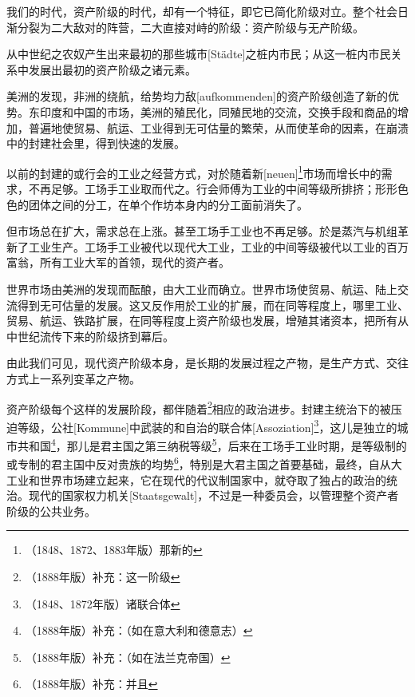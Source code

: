 \documentclass[a4paper,12pt]{ctexart}
\begin{document}
我们的时代，资产阶级的时代，却有一个特征，即它已简化阶级对立。整个社会日渐分裂为二大敌对的阵营，二大直接对峙的阶级：资产阶级与无产阶级。


从中世纪之农奴产生出来最初的那些城市[Städte]之桩内市民；从这一桩内市民关系中发展出最初的资产阶级之诸元素。

美洲的发现，非洲的绕航，给势均力敌[aufkommenden]的资产阶级创造了新的优势。东印度和中国的市场，美洲的殖民化，同殖民地的交流，交换手段和商品的增加，普遍地使贸易、航运、工业得到无可估量的繁荣，从而使革命的因素，在崩溃中的封建社会里，得到快速的发展。

以前的封建的或行会的工业之经营方式，对於随着新[neuen]\footnote{（1848、1872、1883年版）那新的}市场而增长中的需求，不再足够。工场手工业取而代之。行会师傅为工业的中间等级所排挤；形形色色的团体之间的分工，在单个作坊本身内的分工面前消失了。

但市场总在扩大，需求总在上涨。甚至工场手工业也不再足够。於是蒸汽与机组革新了工业生产。工场手工业被代以现代大工业，工业的中间等级被代以工业的百万富翁，所有工业大军的首领，现代的资产者。

世界市场由美洲的发现而酝酿，由大工业而确立。世界市场使贸易、航运、陆上交流得到无可估量的发展。这又反作用於工业的扩展，而在同等程度上，哪里工业、贸易、航运、铁路扩展，在同等程度上资产阶级也发展，增殖其诸资本，把所有从中世纪流传下来的阶级挤到幕后。

由此我们可见，现代资产阶级本身，是长期的发展过程之产物，是生产方式、交往方式上一系列变革之产物。


资产阶级每个这样的发展阶段，都伴随着\footnote{（1888年版）补充：这一阶级}相应的政治进步。封建主统治下的被压迫等级，公社[Kommune]中武装的和自治的联合体[Assoziation]\footnote{（1848、1872年版）诸联合体}，这儿是独立的城市共和国\footnote{（1888年版）补充：（如在意大利和德意志）}，那儿是君主国之第三纳税等级\footnote{（1888年版）补充：（如在法兰克帝国）}，后来在工场手工业时期，是等级制的或专制的君主国中反对贵族的均势\footnote{（1888年版）补充：并且}，特别是大君主国之首要基础，最终，自从大工业和世界市场建立起来，它在现代的代议制国家中，就夺取了独占的政治的统治。现代的国家权力机关[Staatsgewalt]，不过是一种委员会，以管理整个资产者阶级的公共业务。
\end{document}
